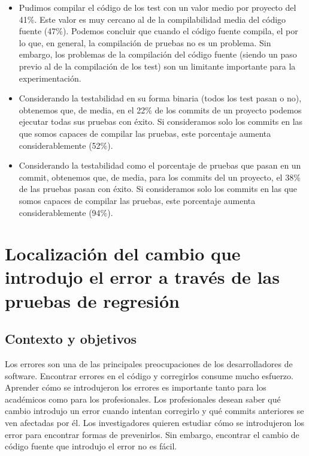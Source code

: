 \begin{itemize}
    \item Pudimos compilar el código de los test con un valor medio por proyecto del 41\%. Este valor es muy cercano al de la compilabilidad media del código fuente (47\%). Podemos concluir que cuando el código fuente compila, el por lo que, en general, la compilación de pruebas no es un problema. Sin embargo, los problemas de la compilación del código fuente (siendo un paso previo al de la compilación de los test) son un limitante importante para la experimentación.
    \item Considerando la testabilidad en su forma binaria (todos los test pasan o no), obtenemos que, de media, en el 22\% de los commits de un proyecto podemos ejecutar todas sus pruebas con éxito. Si consideramos solo los commits en las que somos capaces de compilar las pruebas, este porcentaje aumenta considerablemente (52\%).
    \item Considerando la testabilidad como el porcentaje de pruebas que pasan en un commit, obtenemos que, de media, para los commits del un proyecto, el 38\% de las pruebas pasan con éxito. Si consideramos solo los commits en las que somos capaces de compilar las pruebas, este porcentaje aumenta considerablemente (94\%). 
\end{itemize}


\section{Localización del cambio que introdujo el error a través de las pruebas de regresión}
\label{sec:resumen:bug-hunter}

\subsection{Contexto y objetivos}

Los errores son una de las principales preocupaciones de los desarrolladores de software. 
Encontrar errores en el código y corregirlos consume mucho esfuerzo. 
Aprender cómo se introdujeron los errores es importante tanto para los académicos como para los profesionales. 
Los profesionales desean saber qué cambio introdujo un error cuando intentan corregirlo y qué commits anteriores se ven afectadas por él. 
Los investigadores quieren estudiar cómo se introdujeron los error para encontrar formas de prevenirlos. 
Sin embargo, encontrar el cambio de código fuente que introdujo el error no es fácil.

